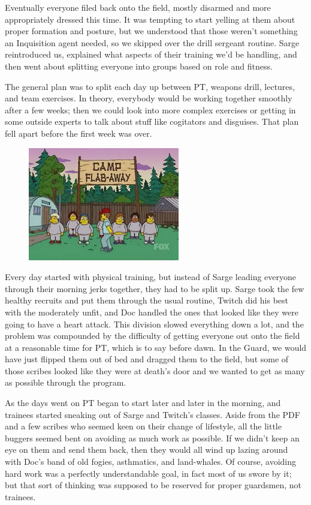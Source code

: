 Eventually everyone filed back onto the field, mostly disarmed and more appropriately dressed this time. 
It was tempting to start yelling at them about proper formation and posture, but we understood that those weren’t something an Inquisition agent needed, so we skipped over the drill sergeant routine. 
Sarge reintroduced us, explained what aspects of their training we’d be handling, and then went about splitting everyone into groups based on role and fitness.

The general plan was to split each day up between PT, weapons drill, lectures, and team exercises. 
In theory, everybody would be working together smoothly after a few weeks; 
then we could look into more complex exercises or getting in some outside experts to talk about stuff like cogitators and disguises. 
That plan fell apart before the first week was over.

\begin{figure}
	\begin{center}
		\includegraphics[width=\figwidth]{pics/8/11.png}
	\end{center}
\end{figure}
Every day started with physical training, but instead of Sarge leading everyone through their morning jerks together, they had to be split up. 
Sarge took the few healthy recruits and put them through the usual routine, Twitch did his best with the moderately unfit, and Doc handled the ones that looked like they were going to have a heart attack. 
This division slowed everything down a lot, and the problem was compounded by the difficulty of getting everyone out onto the field at a reasonable time for PT, which is to say before dawn. 
In the Guard, we would have just flipped them out of bed and dragged them to the field, but some of those scribes looked like they were at death’s door and we wanted to get as many as possible through the program.

As the days went on PT began to start later and later in the morning, and trainees started sneaking out of Sarge and Twitch’s classes. 
Aside from the PDF and a few scribes who seemed keen on their change of lifestyle, all the little buggers seemed bent on avoiding as much work as possible. 
If we didn’t keep an eye on them and send them back, then they would all wind up lazing around with Doc’s band of old fogies, asthmatics, and land-whales. 
Of course, avoiding hard work was a perfectly understandable goal, in fact most of us swore by it; 
but that sort of thinking was supposed to be reserved for proper guardsmen, not trainees. 


